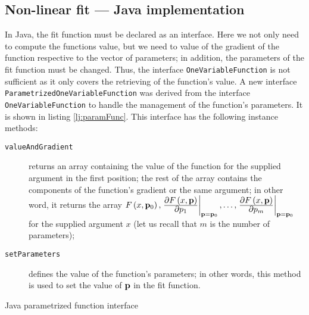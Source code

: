 \documentclass[twoside]{book}
\begin{document}
\subsection{Non-linear fit --- Java implementation}
\label{sec:jlsfnonlin}In Java, the fit function must be declared
as an interface. Here we not only need to compute the functions
value, but we need to value of the gradient of the function
respective to the vector of parameters; in addition, the
parameters of the fit function must be changed. Thus, the
interface {\tt OneVariableFunction} is not sufficient as it only
covers the retrieving of the function's value. A new interface
{\tt ParametrizedOneVariableFunction} was derived from the
interface {\tt OneVariableFunction} to handle the management of
the function's parameters. It is shown in listing
\ref{lj:paramFunc}. This interface has the following instance
methods:
\begin{description}
  \item[\tt valueAndGradient] returns an array containing the
  value of the function for the supplied argument in the first
  position; the rest of the array contains the components of the
  function's gradient or the same argument;
  in other word, it returns the array $F\left(x,{\bf
p}_0\right),\left.{\displaystyle\partial F\left(x,{\bf
p}\right)\over\displaystyle\partial p_1}\right|_{{\bf p}={\bf
p}_0},\ldots,\left.{\displaystyle\partial F\left(x,{\bf
p}\right)\over\displaystyle\partial p_m}\right|_{{\bf p}={\bf
p}_0}$ for the supplied argument $x$ (let us recall that $m$ is
the number of parameters);
  \item[\tt setParameters] defines the value of the function's
  parameters; in other words, this method is used to set the value
  of ${\bf p}$ in the fit function.
\end{description}
\begin{listing} Java parametrized function interface \label{lj:paramFunc}

\end{listing}
\end{document}
